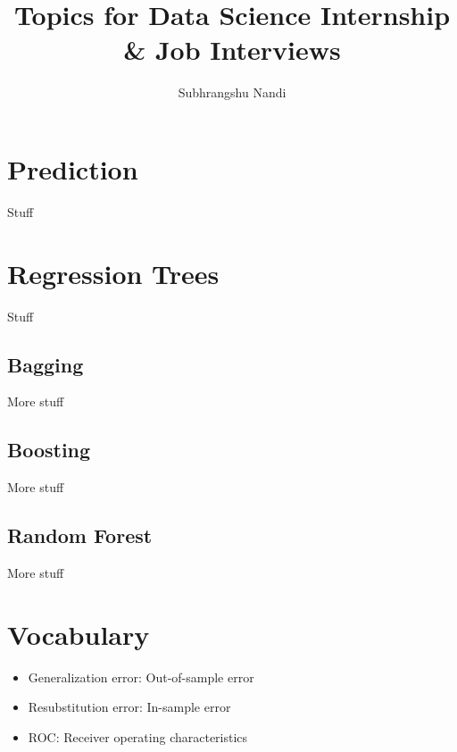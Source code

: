 \documentclass[11pt]{extarticle} %
\begin{document}
\title{Topics for Data Science Internship \& Job Interviews}
\author{Subhrangshu Nandi}
\date{}

\maketitle

\tableofcontents
\newpage

\section{Prediction}
Stuff

\section{Regression Trees}
Stuff

\subsection{Bagging}
More stuff

\subsection{Boosting}
More stuff

\subsection{Random Forest}
More stuff

\section{Vocabulary}
\begin{itemize}
\item Generalization error: Out-of-sample error
\item Resubstitution error: In-sample error
\item ROC: Receiver operating characteristics
\end{itemize}
\end{document}
